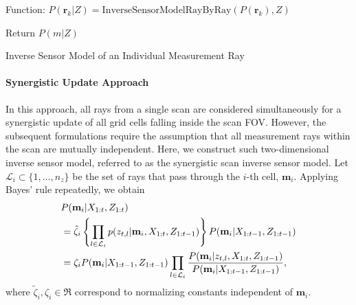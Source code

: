 \vspace*{0.05\columnwidth}
\begin{algorithm}[H]
	Function: $P(\mathbf{r}_k|Z)=\text{InverseSensorModelRayByRay}(P(\mathbf{r}_k),Z)$\;
	
	Return $P(m|Z)$\;
\caption{Inverse Sensor Model of an Individual Measurement Ray}
\label{alg:RayByRayISM}
\end{algorithm}
\vspace*{0.05\columnwidth}





\paragraph{Synergistic Update Approach}

In this approach, all rays from a single scan are considered simultaneously for a synergistic update of all grid cells falling inside the scan FOV. However, the subsequent formulations require the assumption that all measurement rays within the scan are mutually independent.
Here, we construct such two-dimensional inverse sensor model, referred to as the synergistic scan inverse sensor model.
Let $\mathcal L_i\subset\{1,\ldots, n_z\}$ be the set of rays that pass through the $i$-th cell, $\mathbf{m}_i$. Applying Bayes' rule repeatedly, we obtain
\begin{align}
&P(\mathbf{m}_i|X_{1:t},Z_{1:t})\nonumber\\
&=\tilde\zeta_i\braces{\prod_{l\in\mathcal{L}_i}p(z_{t,l}|\mathbf{m}_i,X_{1:t},Z_{1:t-1})}P(\mathbf{m}_i|X_{1:t-1},Z_{1:t-1})\nonumber\\
&=
\zeta_i P(\mathbf{m}_i|X_{1:t-1},Z_{1:t-1})%
\prod_{l\in\mathcal{L}_i}\frac{P(\mathbf{m}_i|z_{t,l},X_{1:t},Z_{1:t-1})}{P(\mathbf{m}_i|X_{1:t-1},Z_{1:t-1})},
\label{eqn:ThirdBayesRule}
\end{align}
where $\tilde\zeta_i,\zeta_i\in\Re$ correspond to normalizing constants independent of $\mathbf{m}_i$. 

